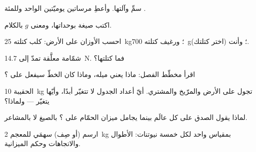 \begin{exercise}[$\star$]\label{exo:g9:weight-vs-mass:1}
سمِّ   وآلتها. وأعطِ مرساتين يوميّتين  الواحد
وللمئة .
\end{exercise}

\begin{exercise}[$\star$]\label{exo:g9:weight-vs-mass:2}
اكتب صيغة  بوحداتها، ومعنى $g$ بالكلام.
\end{exercise}

\begin{exercise}[$\star$]\label{exo:g9:weight-vs-mass:3}
احسب الأوزان على الأرض: كلب كتلته \qty{25}{kg}؛ ورغيف كتلته
\qty{700}{g}؛ وأنت (اختر كتلتك).
\end{exercise}

\begin{exercise}[$\star$]\label{exo:g9:weight-vs-mass:4}
شمّامة معلَّقة تمدّ  إلى \qty{14.7}{N}. فما
كتلتها؟
\end{exercise}

\begin{exercise}[$\star$]\label{exo:g9:weight-vs-mass:5}
اقرأ مخطّط الفصل: ماذا يعني ميله، وماذا كان الخطّ سيفعل على
؟
\end{exercise}

\begin{exercise}[$\star$]\label{exo:g9:weight-vs-mass:6}
الحقيبة \qty{10}{kg} تجول على الأرض  والمرّيخ والمشتري.
أيّ أعداد الجدول لا تتغيّر أبدًا، وأيّها يتغيّر --- ولماذا؟
\end{exercise}

\begin{exercise}[$\star$]\label{exo:g9:weight-vs-mass:7}
لماذا يقول  الصدق على كل عالَم بينما يجامل ميزان
الحمّام على ؟ بالصيغ لا بالمشاعر.
\end{exercise}

\begin{exercise}[$\star$]\label{exo:g9:weight-vs-mass:8}
ارسم (أو صِف) سهمَي  للمعجم \qty{2}{kg} بمقياس 
واحد لكل خمسة نيوتنات: الأطوال والاتجاهات وحكم الميزانية.
\end{exercise}

